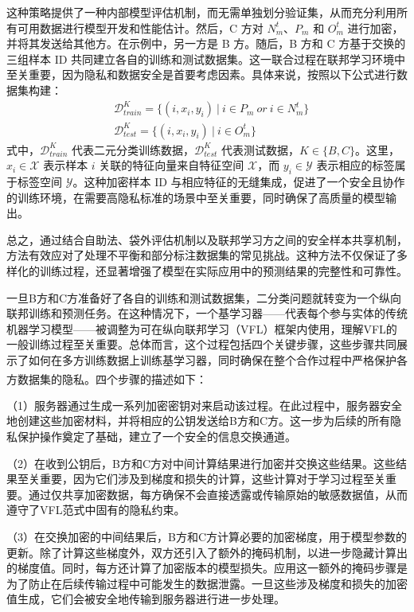 这种策略提供了一种内部模型评估机制，而无需单独划分验证集，从而充分利用所有可用数据进行模型开发和性能估计。然后，C 方对 $N_{m}^{t}$、$P_{m}$ 和 $O_{m}^{t}$ 进行加密，并将其发送给其他方。在示例中，另一方是 B 方。随后，B 方和 C 方基于交换的三组样本 ID 共同建立各自的训练和测试数据集。这一联合过程在联邦学习环境中至关重要，因为隐私和数据安全是首要考虑因素。具体来说，按照以下公式进行数据集构建：
\begin{equation}
	\begin{split}
		&\mathsf{\mathcal{D}}_{train}^{K}=\{(i,x_{i},y_{i}) \ | \ i\in P_{m}\ or\ i\in N_{m}^{t}\}\\
		&\mathsf{\mathcal{D}}_{test}^{K}=\{(i,x_{i},y_{i}) \ | \ i\in O_{m}^{t}\}
	\end{split}
\end{equation}
式中，$\mathsf{\mathcal{D}}_{train}^{K}$ 代表二元分类训练数据，$\mathsf{\mathcal{D}}_{test}^{K}$ 代表测试数据，$K\in \{B,C\}$。这里，$x_{i}\in \mathsf{\mathcal{X}}$ 表示样本 $i$ 关联的特征向量来自特征空间 $\mathsf{\mathcal{X}}$，而 $y_{i}\in \mathsf{\mathcal{Y}}$ 表示相应的标签属于标签空间 $\mathsf{\mathcal{Y}}$。这种加密样本 ID 与相应特征的无缝集成，促进了一个安全且协作的训练环境，在需要高隐私标准的场景中至关重要，同时确保了高质量的模型输出。

总之，通过结合自助法、袋外评估机制以及联邦学习方之间的安全样本共享机制，方法有效应对了处理不平衡和部分标注数据集的常见挑战。这种方法不仅保证了多样化的训练过程，还显著增强了模型在实际应用中的预测结果的完整性和可靠性。

一旦B方和C方准备好了各自的训练和测试数据集，二分类问题就转变为一个纵向联邦训练和预测任务。在这种情况下，一个基学习器——代表每个参与实体的传统机器学习模型——被调整为可在纵向联邦学习（VFL）框架内使用，理解VFL的一般训练过程至关重要。总体而言，这个过程包括四个关键步骤，这些步骤共同展示了如何在多方训练数据上训练基学习器，同时确保在整个合作过程中严格保护各方数据集的隐私\textsuperscript{\cite{yang2019federated}}。四个步骤的描述如下：

（1）服务器通过生成一系列加密密钥对来启动该过程。在此过程中，服务器安全地创建这些加密材料，并将相应的公钥发送给B方和C方。这一步为后续的所有隐私保护操作奠定了基础，建立了一个安全的信息交换通道。

（2）在收到公钥后，B方和C方对中间计算结果进行加密并交换这些结果。这些结果至关重要，因为它们涉及到梯度和损失的计算，这些计算对于学习过程至关重要。通过仅共享加密数据，每方确保不会直接透露或传输原始的敏感数据值，从而遵守了VFL范式中固有的隐私约束。

（3）在交换加密的中间结果后，B方和C方计算必要的加密梯度，用于模型参数的更新。除了计算这些梯度外，双方还引入了额外的掩码机制，以进一步隐藏计算出的梯度值。同时，每方还计算了加密版本的模型损失。应用这一额外的掩码步骤是为了防止在后续传输过程中可能发生的数据泄露。一旦这些涉及梯度和损失的加密值生成，它们会被安全地传输到服务器进行进一步处理。

